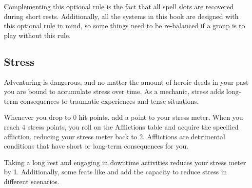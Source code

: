     Complementing this optional rule is the fact that all spell slots are recovered during short rests.
    Additionally, all the systems in this book are designed with this optional rule in mind, so some things need to be re-balanced if a group is to play without this rule.

\subsection*{Stress} \label{ssec::stress}
    Adventuring is dangerous, and no matter the amount of heroic deeds in your past you are bound to accumulate stress over time.
    As a mechanic, stress adds long-term consequences to traumatic experiences and tense situations.

    Whenever you drop to 0 hit points, add a point to your stress meter.
    When you reach 4 stress points, you roll on the Afflictions table and acquire the specified affliction, reducing your stress meter back to 2.
    Afflictions are detrimental conditions that have short or long-term consequences for you.

    Taking a long rest and engaging in downtime activities reduces your stress meter by 1.
    Additionally, some feats like \pageref{feat::entertainer} and \pageref{feat::reliever} add the capacity to reduce stress in different scenarios.

